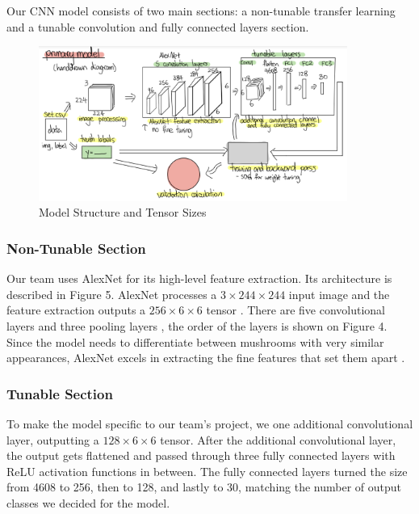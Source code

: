 \documentclass{article} %
\begin{document}
Our CNN model consists of two main sections: a non-tunable transfer learning and a tunable convolution and fully connected layers section.

\begin{figure}[h]
    \begin{center}
    \includegraphics[width=0.9\textwidth]{figures/primaryModelDiagram.png}
    \end{center}
    \caption{Model Structure and Tensor Sizes}
\end{figure}

\subsubsection{Non-Tunable Section}
  
Our team uses AlexNet for its high-level feature extraction. Its architecture is described in Figure 5. AlexNet processes a $3 \times 244 \times 244$ input image and the feature extraction outputs a $256 \times 6 \times 6$ tensor \citep{Bangar.AlexNetArchitectureExplained.2022}. There are five convolutional layers and three pooling layers \citep{Bangar.AlexNetArchitectureExplained.2022}, the order of the layers is shown on Figure 4. Since the model needs to differentiate between mushrooms with very similar appearances, AlexNet excels in extracting the fine features that set them apart \citep{Bangar.AlexNetArchitectureExplained.2022}.
  
\subsubsection{Tunable Section}
  
To make the model specific to our team's project, we one additional convolutional layer, outputting a $128 \times 6 \times 6$ tensor. After the additional convolutional layer, the output gets flattened and passed through three fully connected layers with ReLU activation functions in between. The fully connected layers turned the size from 4608 to 256, then to 128, and lastly to 30, matching the number of output classes we decided for the model.
  
\end{document}
